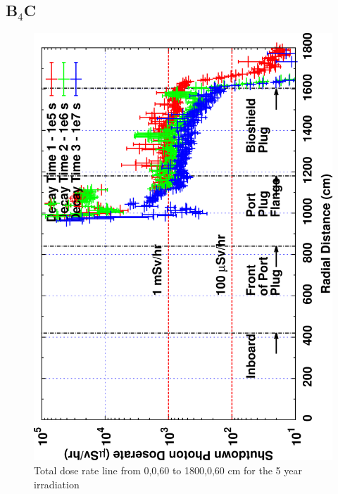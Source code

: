 \documentclass[12pt]{article}
\begin{document}
\subsection{B$_4$C}
\begin{figure}[ht!]
\centering
\includegraphics[clip,scale=0.12,angle=-90]{../plots/photon_lineout/5yr/b4c_5yr.png}
\caption{Total dose rate line from 0,0,60 to 1800,0,60 cm for the 5 year irradiation}
\label{fig:photons_5y_b4c_dose}
\end{figure}
\end{document}
